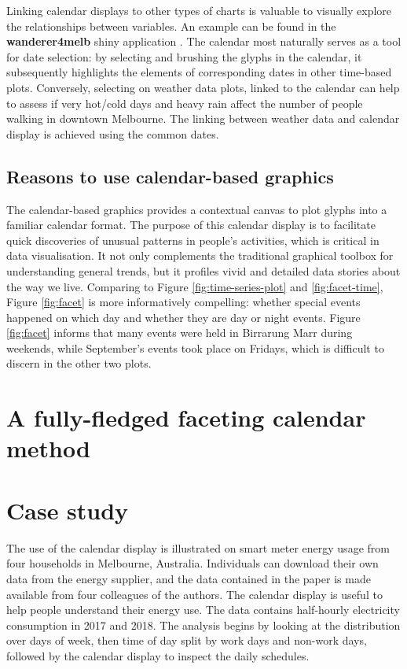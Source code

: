 \documentclass[12pt]{article}
\begin{document}
Linking calendar displays to other types of charts is valuable to visually explore the relationships between variables. An example can be found in the \textbf{wanderer4melb} shiny application \citep{R-wanderer4melb}. The calendar most naturally serves as a tool for date selection: by selecting and brushing the glyphs in the calendar, it subsequently highlights the elements of corresponding dates in other time-based plots. Conversely, selecting on weather data plots, linked to the calendar can help to assess if very hot/cold days and heavy rain affect the number of people walking in downtown Melbourne. The linking between weather data and calendar display is achieved using the common dates.

\hypertarget{reasons-to-use-calendar-based-graphics}{%
\subsection{Reasons to use calendar-based graphics}\label{reasons-to-use-calendar-based-graphics}}

The calendar-based graphics provides a contextual canvas to plot glyphs into a familiar calendar format. The purpose of this calendar display is to facilitate quick discoveries of unusual patterns in people's activities, which is critical in data visualisation. It not only complements the traditional graphical toolbox for understanding general trends, but it profiles vivid and detailed data stories about the way we live. Comparing to Figure \ref{fig:time-series-plot} and \ref{fig:facet-time}, Figure \ref{fig:facet} is more informatively compelling: whether special events happened on which day and whether they are day or night events. Figure \ref{fig:facet} informs that many events were held in Birrarung Marr during weekends, while September's events took place on Fridays, which is difficult to discern in the other two plots.

\hypertarget{sec:facet-calendar}{%
\section{A fully-fledged faceting calendar method}\label{sec:facet-calendar}}

\hypertarget{sec:case}{%
\section{Case study}\label{sec:case}}

The use of the calendar display is illustrated on smart meter energy usage from four households in Melbourne, Australia. Individuals can download their own data from the energy supplier, and the data contained in the paper is made available from four colleagues of the authors. The calendar display is useful to help people understand their energy use. The data contains half-hourly electricity consumption in 2017 and 2018. The analysis begins by looking at the distribution over days of week, then time of day split by work days and non-work days, followed by the calendar display to inspect the daily schedules.
\end{document}
